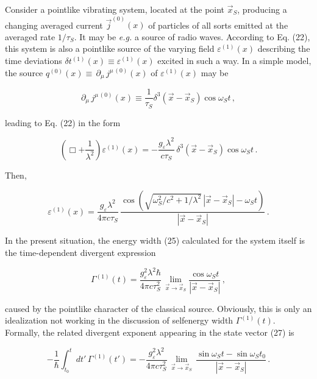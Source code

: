 \documentclass[a4paper,12pt]{article}
\begin{document}
Consider a pointlike vibrating system, located at the point $\vec{x}_S$, producing a changing averaged current $\vec{j}^{(0)}(x)$ of particles of all sorts emitted at the averaged rate $ 1/\tau_S $. It may be {\it e.g.} a source of radio waves. According to Eq. (22), this system is also a pointlike source of the varying field $\varepsilon^{(1)}(x)$ describing the time deviations $\delta t^{(1)}(x) \equiv \varepsilon^{(1)}(x)$ excited in such a way. In a simple model, the source $q^{(0)}( x) \equiv \,\partial_\mu\, j^{\mu\,(0)}(x)$ of $ \varepsilon^{(1)}(x)$ may be 

\begin{equation}
\partial_\mu \,j^{\mu\,(0)}(x) \equiv \frac{1}{\tau_S}\delta^3(\vec{x}-\vec{x}_S) \cos \omega_S t\,,
\end{equation}

\ni leading to Eq. (22) in the form

\begin{equation}
\left( \Box + \frac{1}{\lambda^2}\right) \varepsilon^{(1)} (x) = - \frac{g_\varepsilon \lambda^2}{c \tau_S} \,\delta^3(\vec{x}-\vec{x}_S) \cos \omega_S t\,.
\end{equation}

\ni Then,

\begin{equation}
\varepsilon^{(1)} (x) =  \frac{g_\varepsilon \lambda^2}{4\pi c \tau_S}\, \frac{\cos(\sqrt{\omega^2_S/c^2 + 1/\lambda^2} \,|\vec{x} - \vec{x}_S| - \omega_S t)}{ |\vec{x} - \vec{x}_S|} \,.
\end{equation}

In the present situation, the energy width (25) calculated for the system itself is the time-dependent divergent expression

\begin{equation}
\Gamma^{(1)}(t) = \frac{g^2_\varepsilon \lambda^2 \hbar}{4\pi c \tau_S^2}\, \lim_{\vec{x} \rightarrow \vec{x}_S} \frac{\cos \omega_S t}{|\vec{x}-\vec{x}_S|} \,,
\end{equation}

\ni caused by the pointlike character of the classical source. Obviously, this is only an idealization not working in the discussion of selfenergy width $\Gamma^{(1)}(t)$. Formally, the related divergent exponent appearing in the state vector (27) is

\begin{equation}
-\frac{1}{\hbar} \int^t_{t_0} dt'\, \Gamma^{(1)}(t') = -\frac{g^2_\varepsilon \lambda^2}{4\pi c \tau_S^2}\, \lim_{\vec{x} \rightarrow \vec{x}_S}\, \frac{\sin \omega_S t - \sin \omega_S t_0}{|\vec{x}-\vec{x}_S|} \,.
\end{equation}
\end{document}
